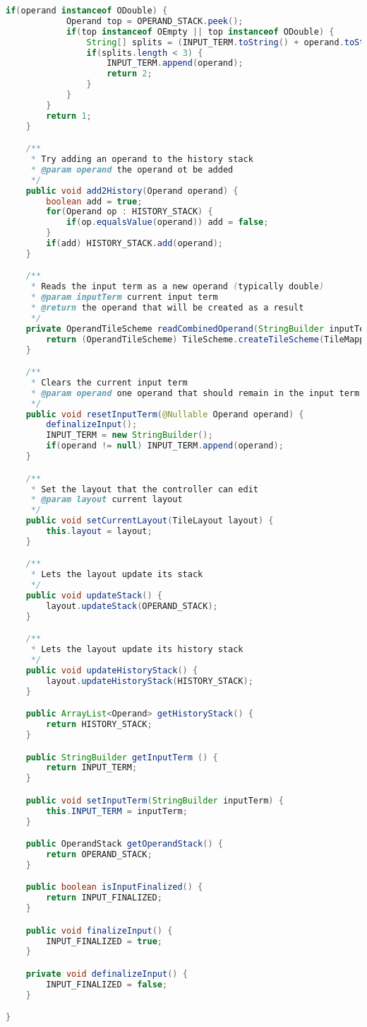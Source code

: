 \begin{lstlisting}[caption=Presenter,label=list:Presenter,language=Java]
        if(operand instanceof ODouble) {
            Operand top = OPERAND_STACK.peek();
            if(top instanceof OEmpty || top instanceof ODouble) {
                String[] splits = (INPUT_TERM.toString() + operand.toString()).split(".");
                if(splits.length < 3) {
                    INPUT_TERM.append(operand);
                    return 2;
                }
            }
        }
        return 1;
    }

    /**
     * Try adding an operand to the history stack
     * @param operand the operand ot be added
     */
    public void add2History(Operand operand) {
        boolean add = true;
        for(Operand op : HISTORY_STACK) {
            if(op.equalsValue(operand)) add = false;
        }
        if(add) HISTORY_STACK.add(operand);
    }

    /**
     * Reads the input term as a new operand (typically double)
     * @param inputTerm current input term
     * @return the operand that will be created as a result
     */
    private OperandTileScheme readCombinedOperand(StringBuilder inputTerm) {
        return (OperandTileScheme) TileScheme.createTileScheme(TileMapping.O_DOUBLE, inputTerm.toString());
    }

    /**
     * Clears the current input term
     * @param operand one operand that should remain in the input term
     */
    public void resetInputTerm(@Nullable Operand operand) {
        definalizeInput();
        INPUT_TERM = new StringBuilder();
        if(operand != null) INPUT_TERM.append(operand);
    }

    /**
     * Set the layout that the controller can edit
     * @param layout current layout
     */
    public void setCurrentLayout(TileLayout layout) {
        this.layout = layout;
    }

    /**
     * Lets the layout update its stack
     */
    public void updateStack() {
        layout.updateStack(OPERAND_STACK);
    }

    /**
     * Lets the layout update its history stack
     */
    public void updateHistoryStack() {
        layout.updateHistoryStack(HISTORY_STACK);
    }

    public ArrayList<Operand> getHistoryStack() {
        return HISTORY_STACK;
    }

    public StringBuilder getInputTerm () {
        return INPUT_TERM;
    }

    public void setInputTerm(StringBuilder inputTerm) {
        this.INPUT_TERM = inputTerm;
    }

    public OperandStack getOperandStack() {
        return OPERAND_STACK;
    }

    public boolean isInputFinalized() {
        return INPUT_FINALIZED;
    }

    public void finalizeInput() {
        INPUT_FINALIZED = true;
    }

    private void definalizeInput() {
        INPUT_FINALIZED = false;
    }

}
\end{lstlisting}    


